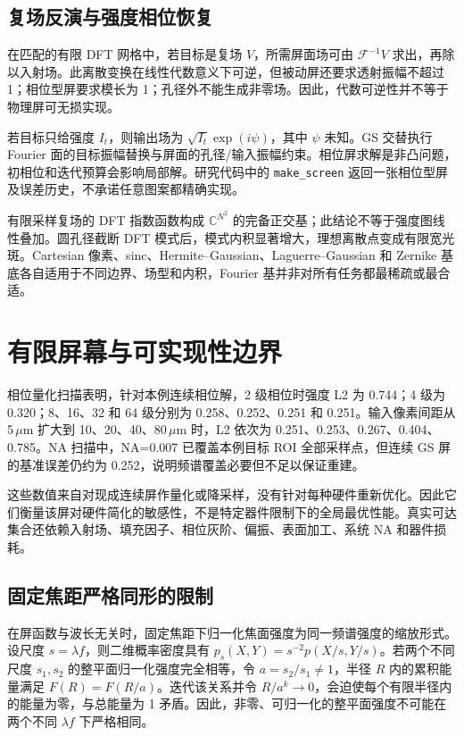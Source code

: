\documentclass[UTF8,a4paper,11pt,fontset=fandol]{ctexart}
\newcommand{\um}{\,\mu\mathrm{m}}
\begin{document}
\subsection{复场反演与强度相位恢复}

在匹配的有限 DFT 网格中，若目标是复场 $V$，所需屏面场可由 $\mathcal F^{-1}V$ 求出，再除以入射场。此离散变换在线性代数意义下可逆，但被动屏还要求透射振幅不超过 1；相位型屏要求模长为 1；孔径外不能生成非零场。因此，代数可逆性并不等于物理屏可无损实现。

若目标只给强度 $I_t$，则输出场为 $\sqrt{I_t}\exp(i\psi)$，其中 $\psi$ 未知。GS 交替执行 Fourier 面的目标振幅替换与屏面的孔径/输入振幅约束。相位屏求解是非凸问题，初相位和迭代预算会影响局部解。研究代码中的 \texttt{make\_screen} 返回一张相位型屏及误差历史，不承诺任意图案都精确实现。

有限采样复场的 DFT 指数函数构成 $\mathbb C^{N^2}$ 的完备正交基；此结论不等于强度图线性叠加。圆孔径截断 DFT 模式后，模式内积显著增大，理想离散点变成有限宽光斑。Cartesian 像素、sinc、Hermite--Gaussian、Laguerre--Gaussian 和 Zernike 基底各自适用于不同边界、场型和内积，Fourier 基并非对所有任务都最稀疏或最合适。

\section{有限屏幕与可实现性边界}

相位量化扫描表明，针对本例连续相位解，2 级相位时强度 L2 为 0.744；4 级为 0.320；8、16、32 和 64 级分别为 0.258、0.252、0.251 和 0.251。输入像素间距从 5\ensuremath{\um} 扩大到 10、20、40、80\ensuremath{\um} 时，L2 依次为 0.251、0.253、0.267、0.404、0.785。NA 扫描中，NA=0.007 已覆盖本例目标 ROI 全部采样点，但连续 GS 屏的基准误差仍约为 0.252，说明频谱覆盖必要但不足以保证重建。

这些数值来自对现成连续屏作量化或降采样，没有针对每种硬件重新优化。因此它们衡量该屏对硬件简化的敏感性，不是特定器件限制下的全局最优性能。真实可达集合还依赖入射场、填充因子、相位灰阶、偏振、表面加工、系统 NA 和器件损耗。

\subsection{固定焦距严格同形的限制}

在屏函数与波长无关时，固定焦距下归一化焦面强度为同一频谱强度的缩放形式。设尺度 $s=\lambda f$，则二维概率密度具有 $p_s(X,Y)=s^{-2}p(X/s,Y/s)$。若两个不同尺度 $s_1,s_2$ 的整平面归一化强度完全相等，令 $a=s_2/s_1\ne1$，半径 $R$ 内的累积能量满足 $F(R)=F(R/a)$。迭代该关系并令 $R/a^k\to0$，会迫使每个有限半径内的能量为零，与总能量为 1 矛盾。因此，非零、可归一化的整平面强度不可能在两个不同 $\lambda f$ 下严格相同。
\end{document}
